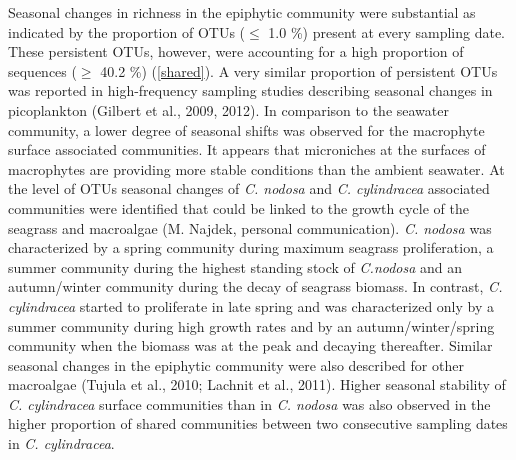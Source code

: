 \documentclass[12pt,]{article}
\begin{document}
Seasonal changes in richness in the epiphytic community were substantial
as indicated by the proportion of OTUs (\(\leq\) 1.0 \si{\percent})
present at every sampling date. These persistent OTUs, however, were
accounting for a high proportion of sequences (\(\geq\) 40.2
\si{\percent}) (\autoref{shared}). A very similar proportion of
persistent OTUs was reported in high-frequency sampling studies
describing seasonal changes in picoplankton (Gilbert et al., 2009,
2012). In comparison to the seawater community, a lower degree of
seasonal shifts was observed for the macrophyte surface associated
communities. It appears that microniches at the surfaces of macrophytes
are providing more stable conditions than the ambient seawater. At the
level of OTUs seasonal changes of \emph{C. nodosa} and \emph{C.
cylindracea} associated communities were identified that could be linked
to the growth cycle of the seagrass and macroalgae (M. Najdek, personal
communication). \emph{C. nodosa} was characterized by a spring community
during maximum seagrass proliferation, a summer community during the
highest standing stock of \emph{C.nodosa} and an autumn/winter community
during the decay of seagrass biomass. In contrast, \emph{C. cylindracea}
started to proliferate in late spring and was characterized only by a
summer community during high growth rates and by an autumn/winter/spring
community when the biomass was at the peak and decaying thereafter.
Similar seasonal changes in the epiphytic community were also described
for other macroalgae (Tujula et al., 2010; Lachnit et al., 2011). Higher
seasonal stability of \emph{C. cylindracea} surface communities than in
\emph{C. nodosa} was also observed in the higher proportion of shared
communities between two consecutive sampling dates in \emph{C.
cylindracea}.
\end{document}
